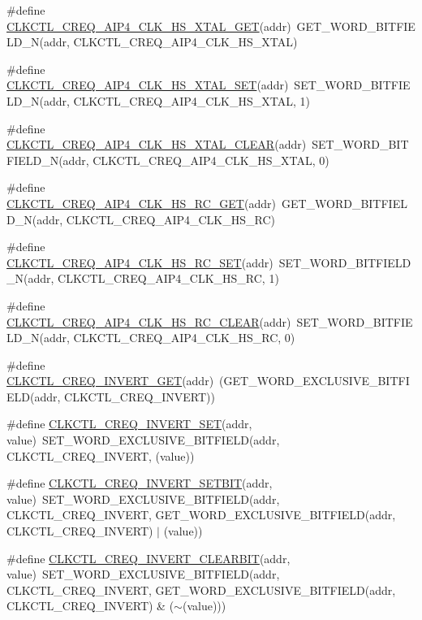 \begin{DoxyCompactItemize}
\item 
\#define \hyperlink{a00544_a536621e912afd0972ec3016bb634004d}{CLKCTL\_\-CREQ\_\-AIP4\_\-CLK\_\-HS\_\-XTAL\_\-GET}(addr)~GET\_\-WORD\_\-BITFIELD\_\-N(addr, CLKCTL\_\-CREQ\_\-AIP4\_\-CLK\_\-HS\_\-XTAL)
\item 
\#define \hyperlink{a00544_a5d2eb3c3ac933ce83ad7aeecdad559e7}{CLKCTL\_\-CREQ\_\-AIP4\_\-CLK\_\-HS\_\-XTAL\_\-SET}(addr)~SET\_\-WORD\_\-BITFIELD\_\-N(addr, CLKCTL\_\-CREQ\_\-AIP4\_\-CLK\_\-HS\_\-XTAL, 1)
\item 
\#define \hyperlink{a00544_a334daff847e21a9bde6720be3ac125d2}{CLKCTL\_\-CREQ\_\-AIP4\_\-CLK\_\-HS\_\-XTAL\_\-CLEAR}(addr)~SET\_\-WORD\_\-BITFIELD\_\-N(addr, CLKCTL\_\-CREQ\_\-AIP4\_\-CLK\_\-HS\_\-XTAL, 0)
\item 
\#define \hyperlink{a00544_a5e536960d032af56b9541c23ed29ed52}{CLKCTL\_\-CREQ\_\-AIP4\_\-CLK\_\-HS\_\-RC\_\-GET}(addr)~GET\_\-WORD\_\-BITFIELD\_\-N(addr, CLKCTL\_\-CREQ\_\-AIP4\_\-CLK\_\-HS\_\-RC)
\item 
\#define \hyperlink{a00544_a143ef8c4d5ccb3c760035c8965d2da5f}{CLKCTL\_\-CREQ\_\-AIP4\_\-CLK\_\-HS\_\-RC\_\-SET}(addr)~SET\_\-WORD\_\-BITFIELD\_\-N(addr, CLKCTL\_\-CREQ\_\-AIP4\_\-CLK\_\-HS\_\-RC, 1)
\item 
\#define \hyperlink{a00544_afd188604c86f54038d39cd8a4826e9c6}{CLKCTL\_\-CREQ\_\-AIP4\_\-CLK\_\-HS\_\-RC\_\-CLEAR}(addr)~SET\_\-WORD\_\-BITFIELD\_\-N(addr, CLKCTL\_\-CREQ\_\-AIP4\_\-CLK\_\-HS\_\-RC, 0)
\item 
\#define \hyperlink{a00544_aec71d746d6ec1cdfa09525634a98d4b3}{CLKCTL\_\-CREQ\_\-INVERT\_\-GET}(addr)~(GET\_\-WORD\_\-EXCLUSIVE\_\-BITFIELD(addr, CLKCTL\_\-CREQ\_\-INVERT))
\item 
\#define \hyperlink{a00544_a08e54bcf8f0bf3e017fe0e2ed108b764}{CLKCTL\_\-CREQ\_\-INVERT\_\-SET}(addr, value)~SET\_\-WORD\_\-EXCLUSIVE\_\-BITFIELD(addr, CLKCTL\_\-CREQ\_\-INVERT, (value))
\item 
\#define \hyperlink{a00544_a7baddb717e554d9c84dce1d7fd1e35d8}{CLKCTL\_\-CREQ\_\-INVERT\_\-SETBIT}(addr, value)~SET\_\-WORD\_\-EXCLUSIVE\_\-BITFIELD(addr, CLKCTL\_\-CREQ\_\-INVERT, GET\_\-WORD\_\-EXCLUSIVE\_\-BITFIELD(addr, CLKCTL\_\-CREQ\_\-INVERT) $|$ (value))
\item 
\#define \hyperlink{a00544_a4c79837806a95c58b15767bef5fd7de9}{CLKCTL\_\-CREQ\_\-INVERT\_\-CLEARBIT}(addr, value)~SET\_\-WORD\_\-EXCLUSIVE\_\-BITFIELD(addr, CLKCTL\_\-CREQ\_\-INVERT, GET\_\-WORD\_\-EXCLUSIVE\_\-BITFIELD(addr, CLKCTL\_\-CREQ\_\-INVERT) \& ($\sim$(value)))
\item 

\end{DoxyCompactItemize}
